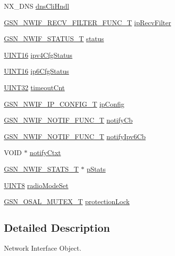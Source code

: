 \begin{DoxyCompactItemize}
\item 
NX\_\-DNS \hyperlink{a00167_abde614bf82e24c537f1b86d562bd9402}{dnsCliHndl}
\item 
\hyperlink{a00534_a2ab3fab7c51c5e11d061387dd44a2381}{GSN\_\-NWIF\_\-RECV\_\-FILTER\_\-FUNC\_\-T} \hyperlink{a00167_ab32f7d6fb4fbd0d87bb049ea5f1e07fa}{ipRecvFilter}
\item 
\hyperlink{a00670_ga31b009654c9ee4d7037151b19f1f213a}{GSN\_\-NWIF\_\-STATUS\_\-T} \hyperlink{a00167_a88c0ed52892de848067fb8ac7d094883}{status}
\item 
\hyperlink{a00660_ga09f1a1fb2293e33483cc8d44aefb1eb1}{UINT16} \hyperlink{a00167_a2a6b0e4974e54ca63107a333a43ecf0f}{ipv4CfgStatus}
\item 
\hyperlink{a00660_ga09f1a1fb2293e33483cc8d44aefb1eb1}{UINT16} \hyperlink{a00167_a9b582be9b7498d93b39a9c866d7bc834}{ip6CfgStatus}
\item 
\hyperlink{a00660_gae1e6edbbc26d6fbc71a90190d0266018}{UINT32} \hyperlink{a00167_a736d67ad1614d227113f632badbe136a}{timeoutCnt}
\item 
\hyperlink{a00172}{GSN\_\-NWIF\_\-IP\_\-CONFIG\_\-T} \hyperlink{a00167_a1dede6b9b16f28827ae79e82aba27440}{ipConfig}
\item 
\hyperlink{a00534_a58445849a3e6cfa33fbc058bafdb717c}{GSN\_\-NWIF\_\-NOTIF\_\-FUNC\_\-T} \hyperlink{a00167_a4ca5a13e12b232c651f00a734c0d327a}{notifyCb}
\item 
\hyperlink{a00534_a58445849a3e6cfa33fbc058bafdb717c}{GSN\_\-NWIF\_\-NOTIF\_\-FUNC\_\-T} \hyperlink{a00167_a780cfacd3edf39c4deef8f1ab64e242a}{notifyIpv6Cb}
\item 
VOID $\ast$ \hyperlink{a00167_a7b0f7b7dc7eadb023bb4b9615423574b}{notifyCtxt}
\item 
\hyperlink{a00176}{GSN\_\-NWIF\_\-STATS\_\-T} $\ast$ \hyperlink{a00167_aec0dbb062c1551edeb82d3a45c451e01}{pStats}
\item 
\hyperlink{a00660_gab27e9918b538ce9d8ca692479b375b6a}{UINT8} \hyperlink{a00167_a7e70681c41285d86fbe97d5ca157c9d1}{radioModeSet}
\item 
\hyperlink{a00628_gae997291afc7166c897f459023e0154ad}{GSN\_\-OSAL\_\-MUTEX\_\-T} \hyperlink{a00167_afb7d19983a90716b80a2f4dbfbf7b0c8}{protectionLock}
\end{DoxyCompactItemize}


\subsection{Detailed Description}
Network Interface Object. 

